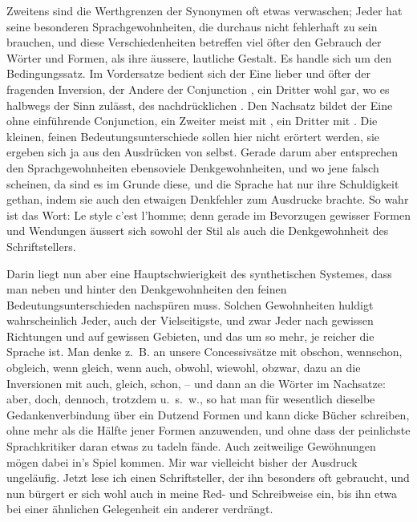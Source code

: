 Zweitens sind die Werthgrenzen der Synonymen oft etwas verwaschen; Jeder hat seine besonderen Sprachgewohnheiten, die durchaus nicht fehlerhaft zu sein brauchen, und diese Verschiedenheiten betreffen viel öfter den Gebrauch der Wörter und Formen, als ihre äussere, lautliche Gestalt. Es handle sich um den Bedingungssatz. Im Vordersatze bedient sich der Eine lieber und öfter der fragenden Inversion, der Andere der Conjunction , ein Dritter wohl gar, wo es halbwegs der Sinn zulässt, des nachdrücklichen . Den Nachsatz bildet der \label{fp.102} Eine ohne einführende Conjunction, ein Zweiter meist mit , ein Dritter mit . Die kleinen, feinen Bedeutungsunterschiede sollen hier nicht erörtert werden, sie ergeben sich ja aus den Ausdrücken von selbst. Gerade darum aber entsprechen den Sprachgewohnheiten ebensoviele Denkgewohnheiten, und wo jene falsch scheinen, da sind es im Grunde diese, und die Sprache hat nur ihre Schuldigkeit gethan, indem sie auch den etwaigen Denkfehler zum Ausdrucke brachte. So wahr ist das Wort: Le style c’est l’homme; denn gerade im Bevorzugen gewisser Formen und Wendungen äussert sich sowohl der Stil als auch die Denkgewohnheit des Schriftstellers.

Darin liegt nun aber eine Hauptschwierigkeit des synthetischen Systemes, dass man neben und hinter den Denkgewohnheiten den feinen Bedeutungsunterschieden nachspüren muss. Solchen Gewohnheiten huldigt wahrscheinlich Jeder, auch der Vielseitigste, und zwar Jeder nach gewissen Richtungen und auf gewissen Gebieten, und das um so mehr, je reicher die Sprache ist. Man denke z.~B. an unsere Concessivsätze mit obschon, wennschon, obgleich, wenn gleich, wenn auch, obwohl, wiewohl, obzwar, dazu an die Inversionen mit auch, gleich, schon, – und dann an die Wörter im Nachsatze: aber, doch, dennoch, trotzdem u.~s.~w., so hat man für wesentlich dieselbe Gedankenverbindung über ein Dutzend Formen und kann dicke Bücher schreiben, ohne mehr als die Hälfte jener Formen anzuwenden, und ohne dass der peinlichste Sprachkritiker daran etwas zu tadeln fände. Auch zeitweilige Gewöhnungen mögen dabei in’s Spiel kommen. Mir war vielleicht bisher der Ausdruck  ungeläufig. Jetzt \label{sp.99} lese ich einen Schriftsteller, der ihn besonders oft gebraucht, und nun bürgert er sich wohl auch in meine Red- und Schreibweise ein, bis ihn etwa bei einer ähnlichen Gelegenheit ein anderer verdrängt.

